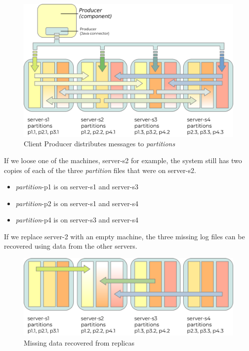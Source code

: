 \documentclass{article}
\newcommand{\kfpartition} {\textit{partition}\xspace}
\newcommand{\kfpartitions} {\textit{partitions}\xspace}
\newcommand{\javaname}[1] {{\ttfamily\color{codeblue} #1}}
\begin{document}
\begin{figure}[H]
\begin{center}
\includegraphics{images/kafka-partitions-03.png}
%
\caption{Client \javaname{Producer} distributes messages to \kfpartitions}
\label{fig:kafka-partitions-01}
\end{center}
\end{figure}

\clearpage
If we loose one of the machines, server-s2 for example, the system still has two copies of each of the three \kfpartition files that were on server-s2.

\begin{itemize}
    \item \kfpartition-p1 is on server-s1 and server-s3
    \item \kfpartition-p2 is on server-s1 and server-s4
    \item \kfpartition-p4 is on server-s3 and server-s4
\end{itemize}

If we replace server-2 with an empty machine, the three missing log files can be recovered using data from the other servers.

\begin{figure}[H]
\begin{center}
\includegraphics{images/kafka-partitions-04.png}
%
\caption{Missing data recovered from replicas}
\label{fig:kafka-partitions-01}
\end{center}
\end{figure}
\end{document}
